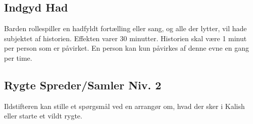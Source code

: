 \subsection*{Indgyd Had}
Barden rollespiller en hadfyldt fortælling eller sang, og alle der lytter, vil hade subjektet af historien. Effekten varer 30 minutter. Historien skal være 1 minut per person som er påvirket. En person kan kun påvirkes af denne evne en gang per time.

\subsection*{Rygte Spreder/Samler Niv. 2}
Ildstifteren kan stille et spørgsmål ved en arrangør om, hvad der sker i Kalish eller starte et vildt rygte.
